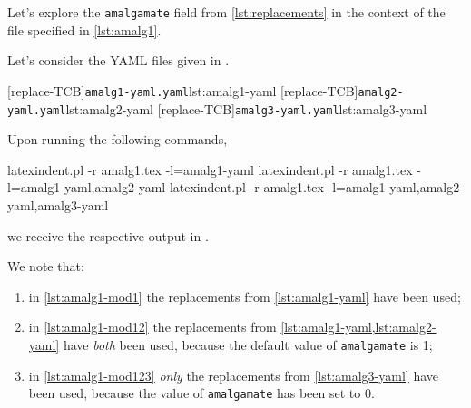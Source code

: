 \documentclass[10pt]{article}
\begin{document}
 \begin{example}
 Let's explore the \texttt{amalgamate} field from \vref{lst:replacements} in the context
 of the file specified in \cref{lst:amalg1}.


 Let's consider the YAML files given in .

 \begin{cmhtcbraster}[raster columns=3,
   raster left skip=-3.75cm,
   raster right skip=-2cm,]
  [replace-TCB]{\texttt{amalg1-yaml.yaml}}{lst:amalg1-yaml}
  [replace-TCB]{\texttt{amalg2-yaml.yaml}}{lst:amalg2-yaml}
  [replace-TCB]{\texttt{amalg3-yaml.yaml}}{lst:amalg3-yaml}
 \end{cmhtcbraster}

 Upon running the following commands, 

 \begin{commandshell}
latexindent.pl -r amalg1.tex -l=amalg1-yaml
latexindent.pl -r amalg1.tex -l=amalg1-yaml,amalg2-yaml
latexindent.pl -r amalg1.tex -l=amalg1-yaml,amalg2-yaml,amalg3-yaml
\end{commandshell}

 we receive the respective output in .

 \begin{cmhtcbraster}[raster columns=3,
   raster left skip=-3.75cm,
   raster right skip=-2cm,]
 \end{cmhtcbraster}
 We note that:
 \begin{enumerate}
  \item in \cref{lst:amalg1-mod1} the replacements from \cref{lst:amalg1-yaml} have been
        used;
  \item in \cref{lst:amalg1-mod12} the replacements from
        \cref{lst:amalg1-yaml,lst:amalg2-yaml} have \emph{both} been used, because the
        default value of \texttt{amalgamate} is 1;
  \item in \cref{lst:amalg1-mod123} \emph{only} the replacements from
        \cref{lst:amalg3-yaml} have been used, because the value of \texttt{amalgamate}
        has been set to 0.
 \end{enumerate}
 \end{example}
\end{document}
